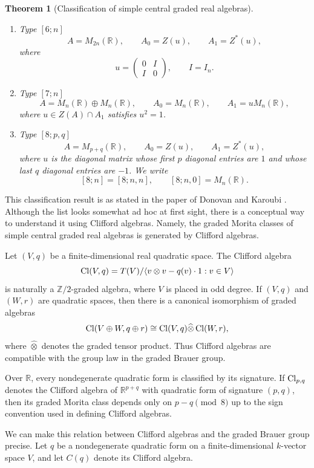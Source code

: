 \documentclass{amsart}
\numberwithin{equation}{section}
\theoremstyle{plain} %
\newtheorem{theorem}[equation]{Theorem}
\theoremstyle{definition}
\theoremstyle{remark}
\begin{document}
\begin{theorem}[Classification of simple central graded real algebras]
\begin{enumerate}
        \item Type $[6;n]$
    \[
        A=M_{2n}(\mathbb R),
        \qquad
        A_0=Z(u),
        \qquad
        A_1=Z^*(u),
    \]
    where
    \[
        u=\begin{pmatrix}
            0 & I\\
            I & 0
        \end{pmatrix},
        \qquad I=I_n.
    \]

        \item Type $[7;n]$
    \[
        A=M_n(\mathbb R)\oplus M_n(\mathbb R),
        \qquad
        A_0=M_n(\mathbb R),
        \qquad
        A_1=uM_n(\mathbb R),
    \]
    where $u\in Z(A)\cap A_1$ satisfies $u^2=1$.

        \item Type $[8;p,q]$
    \[
        A=M_{p+q}(\mathbb R),
        \qquad
        A_0=Z(u),
        \qquad
        A_1=Z^*(u),
    \]
    where $u$ is the diagonal matrix whose first $p$ diagonal entries are $1$ and whose last $q$ diagonal entries are $-1$. We write
    \[
        [8;n]=[8;n,n],
        \qquad
        [8;n,0]=M_n(\mathbb R).
    \]
\end{enumerate}
\end{theorem}
This classification result is as stated in the paper of Donovan and Karoubi \cite{DK}. Although the list looks somewhat ad hoc at first sight, there is a conceptual way to understand it using Clifford algebras. Namely, the graded Morita classes of simple central graded real algebras is generated by Clifford algebras.

Let $(V,q)$ be a finite-dimensional real quadratic space. The Clifford algebra
\[
    \operatorname{Cl}(V,q)=T(V)/\langle v\otimes v-q(v)\cdot 1 : v\in V\rangle
\]
is naturally a $\mathbb Z/2$-graded algebra, where $V$ is placed in odd degree. If $(V,q)$ and $(W,r)$ are quadratic spaces, then there is a canonical isomorphism of graded algebras
\[
    \operatorname{Cl}(V\oplus W,q\oplus r)
    \cong
    \operatorname{Cl}(V,q)\widehat\otimes \operatorname{Cl}(W,r),
\]
where $\widehat\otimes$ denotes the graded tensor product. Thus Clifford algebras are compatible with the group law in the graded Brauer group.

Over $\mathbb R$, every nondegenerate quadratic form is classified by its signature. If $\operatorname{Cl}_{p,q}$ denotes the Clifford algebra of $\mathbb R^{p+q}$ with quadratic form of signature $(p,q)$, then its graded Morita class depends only on $p-q \pmod 8$
up to the sign convention used in defining Clifford algebras.

We can make this relation between Clifford algebras and the
graded Brauer group precise. Let $q$ be a nondegenerate quadratic form on a
finite-dimensional $k$-vector space $V$, and let $C(q)$ denote its Clifford
algebra.
\end{document}
